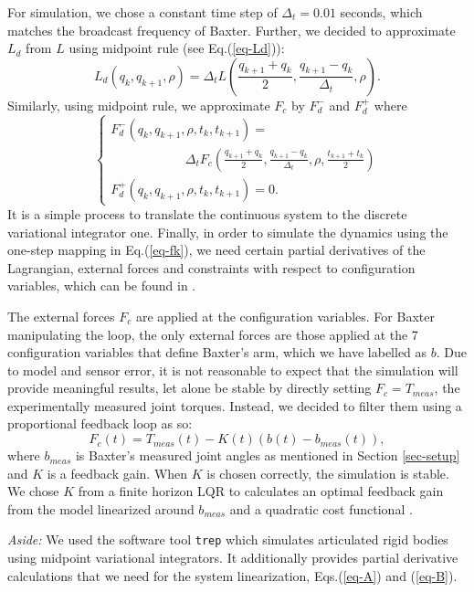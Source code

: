 \documentclass[letterpaper, 10pt, conference]{ieeeconf}
\begin{document}
For simulation, we chose a constant time step of $\Delta_t = 0.01$ seconds, which matches the broadcast frequency of Baxter.  Further, we decided to approximate $L_d$ from $L$ using midpoint rule (see Eq.(\ref{eq-Ld})):
\[
L_d(q_k,q_{k+1},\rho) = \Delta_t L(\frac{q_{k+1}+q_k}{2},\frac{q_{k+1}-q_k}{\Delta_t},\rho).
\]
Similarly, using midpoint rule, we approximate $F_c$ by $F_d^-$ and $F_d^+$ where
\[
\left\{
\begin{array}{l}
F_d^-(q_k,q_{k+1},\rho,t_k,t_{k+1}) = \\\hspace{70pt}\Delta_t F_c(\frac{q_{k+1}+q_k}{2},\frac{q_{k+1}-q_k}{\Delta_t},\rho,\frac{t_{k+1}+t_k}{2})\\
F_d^+(q_k,q_{k+1},\rho,t_k,t_{k+1}) = 0.
\end{array}
\right.
\]
It is a simple process to translate the continuous system to the discrete variational integrator one. Finally, in order to simulate the dynamics using the one-step mapping in Eq.(\ref{eq-fk}), we need certain partial derivatives of the Lagrangian, external forces and constraints with respect to configuration variables, which can be found in \cite{johnson_murphey_scalable}.  

The external forces $F_c$ are applied at the configuration variables.  For Baxter manipulating the loop, the only external forces are those applied at the 7 configuration variables that define Baxter's arm, which we have labelled as $b$. Due to model and sensor error, it is not reasonable to expect that the simulation will provide meaningful results, let alone be stable by directly setting $F_c = T_{meas}$, the experimentally measured joint torques.  Instead, we decided to filter them using a proportional feedback loop as so:
\[
F_{c}(t) = T_{meas}(t) - K(t) (b(t) - b_{meas}(t)),
\]
where $b_{meas}$ is Baxter's measured joint angles as mentioned in Section \ref{sec-setup} and $K$ is a feedback gain.  When $K$ is chosen correctly, the simulation is stable.  We chose $K$ from a finite horizon LQR to calculates an optimal feedback gain from the model linearized around $b_{meas}$ and a quadratic cost functional \cite{anderson_moore}.

\emph{Aside:}  We used the software tool \texttt{trep} \cite{johnson_murphey_scalable} which simulates articulated rigid bodies using midpoint variational integrators.  It additionally provides partial derivative calculations that we need for the system linearization, Eqs.(\ref{eq-A}) and (\ref{eq-B}).  
\end{document}

